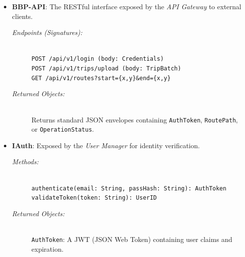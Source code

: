 \begin{itemize}
    \item \begin{minipage}[t]{\linewidth}
        \textbf{BBP-API}: The RESTful interface exposed by the \textit{API Gateway} to external clients.
        \begin{description}
            \item[\textit{Endpoints (Signatures):}] \hfill \\
            \texttt{POST /api/v1/login (body: Credentials)} \\
            \texttt{POST /api/v1/trips/upload (body: TripBatch)} \\
            \texttt{GET /api/v1/routes?start=\{x,y\}\&end=\{x,y\}}
            \item[\textit{Returned Objects:}] \hfill \\
            Returns standard JSON envelopes containing \texttt{AuthToken}, \texttt{RoutePath}, or \texttt{OperationStatus}.
        \end{description}
    \end{minipage}
    \vspace{0.3cm}

    \item \begin{minipage}[t]{\linewidth}
        \textbf{IAuth}: Exposed by the \textit{User Manager} for identity verification.
        \begin{description}
            \item[\textit{Methods:}] \hfill \\
            \texttt{authenticate(email: String, passHash: String): AuthToken} \\
            \texttt{validateToken(token: String): UserID}
            \item[\textit{Returned Objects:}] \hfill \\
            \texttt{AuthToken}: A JWT (JSON Web Token) containing user claims and expiration.
        \end{description}
    \end{minipage}
    \vspace{0.3cm}


\end{itemize}
